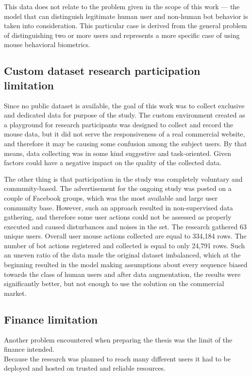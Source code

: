 This data does not relate to the problem given in the scope of this work --- the model that can distinguish legitimate human user and non-human bot behavior is taken into consideration.
This particular case is derived from the general problem of distinguishing two or more users and represents a more specific case of using mouse behavioral biometrics.

\subsection{Custom dataset research participation limitation}\label{subsec:custom-dataset-research}
Since no public dataset is available, the goal of this work was to collect exclusive and dedicated data for purpose of the study.
The custom environment created as a playground for research participants was designed to collect and record the mouse data, but it did not serve the responsiveness of a real commercial website, and therefore it may be causing some confusion among the subject users.
By that means, data collecting was in some kind suggestive and task-oriented.
Given factors could have a negative impact on the quality of the collected data.

The other thing is that participation in the study was completely voluntary and community-based.
The advertisement for the ongoing study was posted on a couple of Facebook groups, which was the most available and large user community base.
However, such an approach resulted in non-supervised data gathering, and therefore some user actions could not be assessed as properly executed and caused disturbances and noises in the set.
The research gathered 63 unique users.
Overall user mouse actions collected are equal to 334,184 rows.
The number of bot actions registered and collected is equal to only 24,791 rows.
Such an uneven ratio of the data made the original dataset imbalanced, which at the beginning resulted in the model making assumptions about every sequence biased towards the class of human users and after data augmentation, the results were significantly better, but not enough to use the solution on the commercial market.

\subsection{Finance limitation}\label{subsec:finance-limitation}
Another problem encountered when preparing the thesis was the limit of the finance intended.\\
Because the research was planned to reach many different users it had to be deployed and hosted on trusted and reliable resources.

